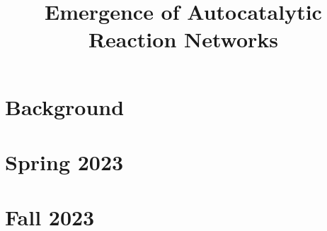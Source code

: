 \documentclass[11pt]{article}
\title{Emergence of Autocatalytic Reaction Networks}
\begin{document}
\maketitle
\section{Background}


\section{Spring 2023}


\section{Fall 2023}
\end{document}
